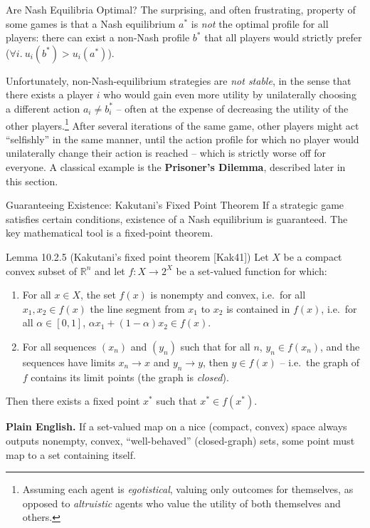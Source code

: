 \documentclass[aspectratio=169,10pt]{beamer}
\newcommand{\R}{\mathbb{R}}
\begin{document}
\begin{frame}{Are Nash Equilibria Optimal?}
  The surprising, and often frustrating, property of some games is that a
  Nash equilibrium $a^*$ is \emph{not} the optimal profile for all
  players: there can exist a non-Nash profile $b^*$ that all players
  would strictly prefer ($\forall i.\ u_i(b^*)>u_i(a^*)$).

  \vspace{0.4em}
  Unfortunately, non-Nash-equilibrium strategies are \emph{not stable}, in
  the sense that there exists a player $i$ who would gain even more utility
  by unilaterally choosing a different action $a_i\neq b_i^*$ -- often at
  the expense of decreasing the utility of the other players.\footnote{Assuming
  each agent is \emph{egotistical}, valuing only outcomes for themselves,
  as opposed to \emph{altruistic} agents who value the utility of both
  themselves and others.} After several iterations of the same game,
  other players might act ``selfishly'' in the same manner, until the
  action profile for which no player would unilaterally change their
  action is reached -- which is strictly worse off for everyone. A
  classical example is the \textbf{Prisoner's Dilemma}, described later in
  this section.
\end{frame}

\begin{frame}{Guaranteeing Existence: Kakutani's Fixed Point Theorem}
  If a strategic game satisfies certain conditions, existence of a Nash
  equilibrium is guaranteed. The key mathematical tool is a fixed-point
  theorem.

  \begin{block}{Lemma 10.2.5 (Kakutani's fixed point theorem {\footnotesize[Kak41]})}
    Let $X$ be a compact convex subset of $\R^n$ and let $f:X\to2^X$ be a
    set-valued function for which:
    \begin{enumerate}
      \item For all $x\in X$, the set $f(x)$ is nonempty and convex, i.e.\
        for all $x_1,x_2\in f(x)$ the line segment from $x_1$ to $x_2$ is
        contained in $f(x)$, i.e.\ for all $\alpha\in[0,1]$,
        $\alpha x_1+(1-\alpha)x_2\in f(x)$.
      \item For all sequences $(x_n)$ and $(y_n)$ such that for all $n$,
        $y_n\in f(x_n)$, and the sequences have limits $x_n\to x$ and
        $y_n\to y$, then $y\in f(x)$ -- i.e.\ the graph of $f$ contains its
        limit points (the graph is \emph{closed}).
    \end{enumerate}
    Then there exists a fixed point $x^*$ such that $x^*\in f(x^*)$.
  \end{block}
  \textbf{Plain English.} If a set-valued map on a nice (compact, convex)
  space always outputs nonempty, convex, ``well-behaved'' (closed-graph)
  sets, some point must map to a set containing itself.
\end{frame}
\end{document}
